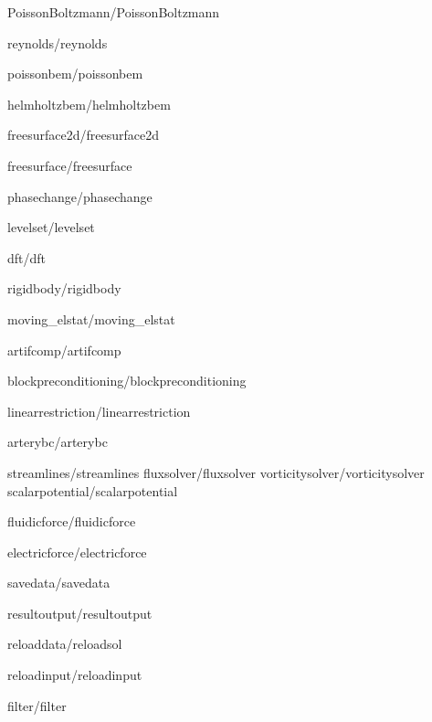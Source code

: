 \documentclass[a4paper,english]{report}    %
\newcommand{\Include}{}
\begin{document}
\graphicspath{{./}{PoissonBoltzmann/}}
\Include{PoissonBoltzmann/PoissonBoltzmann}

\graphicspath{{./}{reynolds/}}
\Include{reynolds/reynolds}

\graphicspath{{./}{poissonbem/}}
\Include{poissonbem/poissonbem}

\graphicspath{{./}{helmholtzbem/}}
\Include{helmholtzbem/helmholtzbem}

\graphicspath{{./}{freesurface2d/}}
\Include{freesurface2d/freesurface2d}

\graphicspath{{./}{freesurface/}}
\Include{freesurface/freesurface}

\graphicspath{{./}{phasechange/}}
\Include{phasechange/phasechange}


\graphicspath{{./}{levelset/}}
\Include{levelset/levelset}

\graphicspath{{./}{dft/}}
\Include{dft/dft}

\graphicspath{{./}{rigidbody/}}
\Include{rigidbody/rigidbody}

\graphicspath{{./}{moving_elstat/}}
\Include{moving_elstat/moving_elstat}

\graphicspath{{./}{artifcomp/}}
\Include{artifcomp/artifcomp}

\graphicspath{{./}{blockpreconditioning/}}
\Include{blockpreconditioning/blockpreconditioning}


\graphicspath{{./}{linearrestriction/}}
\Include{linearrestriction/linearrestriction}

\graphicspath{{./}{arterybc/}}
\Include{arterybc/arterybc}

\graphicspath{{./}{streamlines/}}
\Include{streamlines/streamlines}
\Include{fluxsolver/fluxsolver}
\Include{vorticitysolver/vorticitysolver}
\Include{scalarpotential/scalarpotential}

\Include{fluidicforce/fluidicforce}
\graphicspath{{./}{electricforce/}}
\Include{electricforce/electricforce}

\graphicspath{{./}{savedata/}}
\Include{savedata/savedata}

\graphicspath{{./}{resultoutput/}}
\Include{resultoutput/resultoutput}

\graphicspath{{./}{reloaddata/}}
\Include{reloaddata/reloadsol}

\graphicspath{{./}{reloadinput/}}
\Include{reloadinput/reloadinput}

\graphicspath{{./}{filter/}}
\Include{filter/filter}


\printindex

\end{document}
